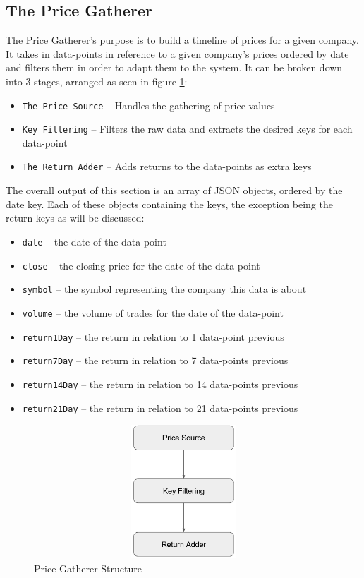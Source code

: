 \subsection{The Price Gatherer}

The Price Gatherer's purpose is to build a timeline of prices for a given company. It takes in data-points in reference to a given company's prices ordered by date and filters them in order to adapt them to the system. It can be broken down into 3 stages, arranged as seen in figure \ref{fig:pricegathererstructure}:
\begin{itemize}
    \item \texttt{The Price Source} -- Handles the gathering of price values
    \item \texttt{Key Filtering} -- Filters the raw data and extracts the desired keys for each data-point
    \item \texttt{The Return Adder} -- Adds returns to the data-points as extra keys
\end{itemize}

The overall output of this section is an array of JSON objects, ordered by the date key. Each of these objects containing the keys, the exception being the return keys as will be discussed:
\begin{itemize}
    \item \texttt{date} -- the date of the data-point
    \item \texttt{close} -- the closing price for the date of the data-point
    \item \texttt{symbol} -- the symbol representing the company this data is about
    \item \texttt{volume} -- the volume of trades for the date of the data-point
    \item \texttt{return1Day} -- the return in relation to 1 data-point previous
    \item \texttt{return7Day} -- the return in relation to 7 data-points previous
    \item \texttt{return14Day} -- the return in relation to 14 data-points previous
    \item \texttt{return21Day} -- the return in relation to 21 data-points previous
\end{itemize}

\begin{figure}[h!]
    \centering
    \includegraphics[width=15cm,height=5cm,keepaspectratio]{design/PriceGathererStructure.png}
    \caption{Price Gatherer Structure}
    \label{fig:pricegathererstructure}
\end{figure}

